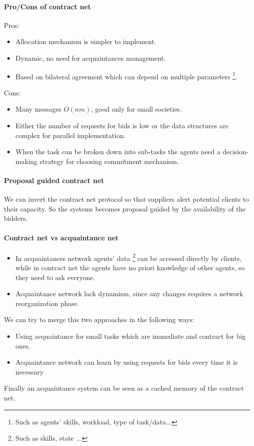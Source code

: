 \documentclass[10pt,a4paper]{article}
\begin{document}
\paragraph{Pro/Cons of contract net}
Pros:
\begin{itemize}
\item Allocation mechanism is simpler to implement.
\item Dynamic, no need for acquaintances management.
\item Based on bilateral agreement which can depend on multiple parameters \footnote{Such as agents' skills, workload, type of task/data...}.
\end{itemize}

Cons:
\begin{itemize}
\item Many messages $O(nm)$, good only for small societies.
\item Either the number of requests for bids is low or the data structures are complex for parallel implementation.
\item When the task can be broken down into sub-tasks the agents need a decision-making strategy for choosing commitment mechanism.
\end{itemize}


\paragraph{Proposal guided contract net}
We can invert the contract net protocol so that suppliers alert potential clients to their capacity. So the systems becomes proposal guided by the availability of the bidders.


\paragraph{Contract net vs acquaintance net}

\begin{itemize}
\item In acquaintances network agents' data \footnote{Such as skills, state ...} can be accessed directly by clients, while in contract net the agents have no priori knowledge of other agents, so they need to ask everyone. 
\item Acquaintance network lack dynamism, since any changes requires a network reorganization phase. 
\end{itemize}

We can try to merge this two approaches in the following ways:
\begin{itemize}
\item Using acquaintance for small tasks which are immediate and contract for big ones.
\item Acquaintance network can learn by using requests for bids every time it is necessary
\end{itemize}
Finally an acquaintance system can be seen as a cached memory of the contract net.
\end{document}
